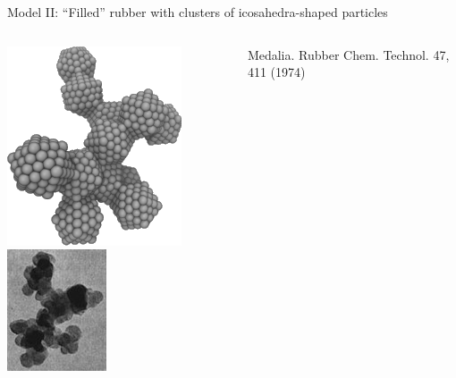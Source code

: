 \documentclass[aspectratio=169,xcolor=table]{beamer}
\begin{document}
\begin{frame}[c]{Model II: ``Filled'' rubber with clusters of icosahedra-shaped particles}
\begin{columns}[T]
{\begin{columns}[c]
      \centering
      \includegraphics[width=\textwidth]{figs/particle_transparent.pdf}
      \centering
      \includegraphics[width=\textwidth]{figs/CB_Image.jpg}
      {\scriptsize Medalia. Rubber Chem. Technol. 47, 411 (1974)\par}


\end{columns}}
\end{columns}
\end{frame}
\end{document}

